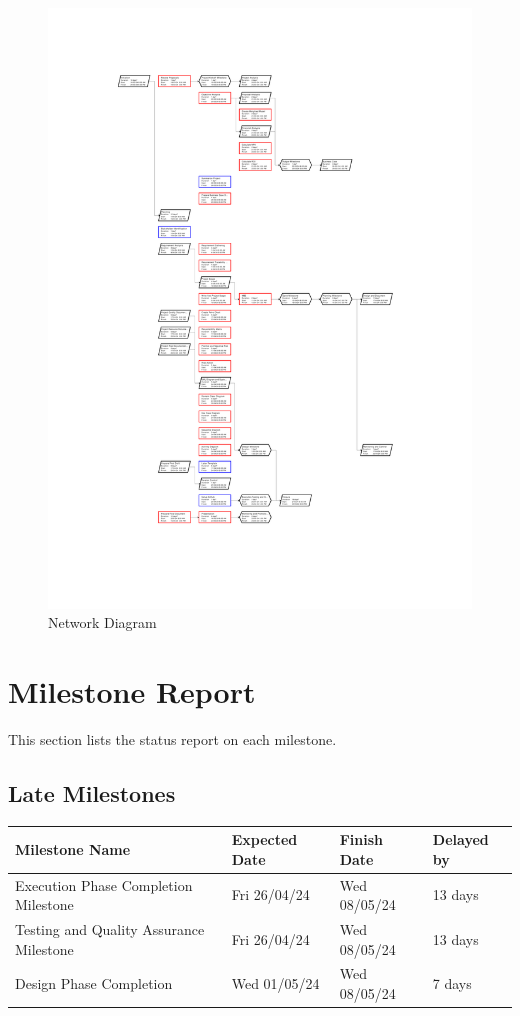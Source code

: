 \begin{figure}[ht]
    \includegraphics[width=\textwidth]{images/network.png}
    \caption{Network Diagram}
    \label{fig:rn_chart1}
\end{figure}

\FloatBarrier

\section{Milestone Report}

This section lists the status report on each milestone.

\subsection*{Late Milestones}
\begin{tabular}{|l|l|l|l|}
\hline
\rowcolor{lightred} Milestone Name & Expected Date & Finish Date & Delayed by \\
\hline
Execution Phase Completion Milestone & Fri 26/04/24 & Wed 08/05/24 & 13 days \\
\hline
Testing and Quality Assurance Milestone & Fri 26/04/24 & Wed 08/05/24 & 13 days \\
\hline
Design Phase Completion & Wed 01/05/24 & Wed 08/05/24 & 7 days \\
\hline
\end{tabular}

